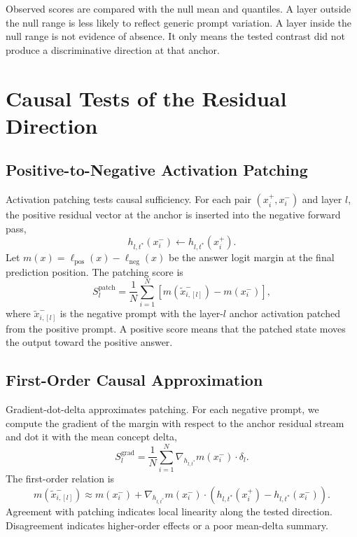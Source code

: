 Observed scores are compared with the null mean and quantiles. A layer outside
the null range is less likely to reflect generic prompt variation. A layer inside
the null range is not evidence of absence. It only means the tested contrast did
not produce a discriminative direction at that anchor.

\section{Causal Tests of the Residual Direction}
\label{sec:causal_validation}

\subsection{Positive-to-Negative Activation Patching}
\label{sec:act_patching}

Activation patching tests causal sufficiency. For each pair \((x_i^+,x_i^-)\) and
layer \(l\), the positive residual vector at the anchor is inserted into the
negative forward pass,
\[
h_{l,t^*}(x_i^-) \leftarrow h_{l,t^*}(x_i^+).
\]
Let \(m(x)=\ell_{\mathrm{pos}}(x)-\ell_{\mathrm{neg}}(x)\) be the answer logit
margin at the final prediction position. The patching score is
\begin{equation}
S_l^{\mathrm{patch}}
=
\frac{1}{N}\sum_{i=1}^{N}
\left[m\!\left(\tilde{x}_{i,[l]}^-\right)-m(x_i^-)\right],
\label{eq:patch_score}
\end{equation}
where \(\tilde{x}_{i,[l]}^-\) is the negative prompt with the layer-\(l\) anchor
activation patched from the positive prompt. A positive score means that the
patched state moves the output toward the positive answer.

\subsection{First-Order Causal Approximation}
\label{sec:grad_dot_delta}

Gradient-dot-delta approximates patching. For each negative prompt, we compute the
gradient of the margin with respect to the anchor residual stream and dot it with
the mean concept delta,
\begin{equation}
S_l^{\mathrm{grad}}
=
\frac{1}{N}\sum_{i=1}^{N}
\nabla_{h_{l,t^*}}m(x_i^- )\cdot\delta_l.
\label{eq:grad_delta_score}
\end{equation}
The first-order relation is
\begin{equation}
m(\tilde{x}_{i,[l]}^-)
\approx
m(x_i^-)
+
\nabla_{h_{l,t^*}}m(x_i^-)
\cdot
\left(h_{l,t^*}(x_i^+) - h_{l,t^*}(x_i^-)\right).
\label{eq:patch_taylor}
\end{equation}
Agreement with patching indicates local linearity along the tested direction.
Disagreement indicates higher-order effects or a poor mean-delta summary.


